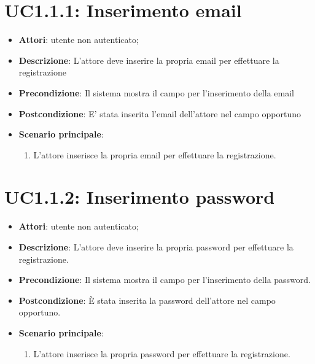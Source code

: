 \section{UC1.1.1: Inserimento email}
\label{UC1.1.1}
\begin{itemize}
	\item \textbf{Attori}: utente non autenticato;
	\item \textbf{Descrizione}: L'attore deve inserire la propria email per effettuare la  registrazione
	\item \textbf{Precondizione}: Il sistema mostra il campo per l'inserimento della email
	\item \textbf{Postcondizione}: E' stata inserita l'email dell'attore nel campo opportuno
	\item \textbf{Scenario principale}:
	\begin{enumerate} \item L'attore inserisce la propria email per effettuare la registrazione.\end{enumerate}
\end{itemize}

\section{UC1.1.2: Inserimento password}
\label{UC1.1.2}
\begin{itemize}
	\item \textbf{Attori}: utente non autenticato;
	\item \textbf{Descrizione}: L'attore deve inserire la propria password per effettuare la registrazione.
	\item \textbf{Precondizione}: Il sistema mostra il campo per l'inserimento della password.
	\item \textbf{Postcondizione}: È stata inserita la password dell'attore nel campo opportuno.
	\item \textbf{Scenario principale}:
	\begin{enumerate} \item L'attore inserisce la propria password per effettuare la registrazione.\end{enumerate}
\end{itemize}

